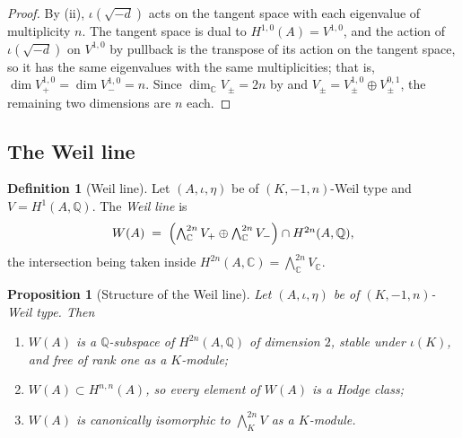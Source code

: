 \documentclass[11pt,reqno]{amsart}
\theoremstyle{plain}
\newtheorem{proposition}[theorem]{Proposition}
\theoremstyle{definition}
\newtheorem{definition}[theorem]{Definition}
\theoremstyle{remark}
\newcommand{\QQ}{\mathbb{Q}}
\newcommand{\CC}{\mathbb{C}}
\newcommand{\HW}{W}                      %
\begin{document}
\begin{proof}
By (ii), $\iota(\sqrt{-d})$ acts on the tangent space with
each eigenvalue of multiplicity $n$. The tangent space is dual to
$H^{1,0}(A)=V^{1,0}$, and the action of $\iota(\sqrt{-d})$ on $V^{1,0}$ by
pullback is the transpose of its action on the tangent space, so it has the
same eigenvalues with the same multiplicities; that is,
$\dim V^{1,0}_{+}=\dim V^{1,0}_{-}=n$. Since $\dim_{\CC}V_{\pm}=2n$ by
 and $V_{\pm}=V^{1,0}_{\pm}\oplus V^{0,1}_{\pm}$, the
remaining two dimensions are $n$ each.
\end{proof}

\subsection{The Weil line}

\begin{definition}[Weil line]\label{def:weilline}
Let $(A,\iota,\eta)$ be of $(K,-1,n)$-Weil type and $V=H^{1}(A,\QQ)$. The
\emph{Weil line} is
\[
  \HW(A)\;=\;\Bigl(\textstyle\bigwedge^{2n}_{\CC}V_{+}\oplus
  \bigwedge^{2n}_{\CC}V_{-}\Bigr)\cap H^{2n}(A,\QQ),
\]
the intersection being taken inside
$H^{2n}(A,\CC)=\bigwedge^{2n}_{\CC}V_{\CC}$.
\end{definition}

\begin{proposition}[Structure of the Weil line]\label{prop:weilline}
Let $(A,\iota,\eta)$ be of $(K,-1,n)$-Weil type. Then
\begin{enumerate}[label=\textup{(\roman*)},nosep]
\item $\HW(A)$ is a $\QQ$-subspace of $H^{2n}(A,\QQ)$ of dimension $2$, stable
  under $\iota(K)$, and free of rank one as a $K$-module;
\item $\HW(A)\subset H^{n,n}(A)$, so every element of $\HW(A)$ is a Hodge class;
\item $\HW(A)$ is canonically isomorphic to $\bigwedge^{2n}_{K}V$ as a
  $K$-module.
\end{enumerate}
\end{proposition}
\end{document}
